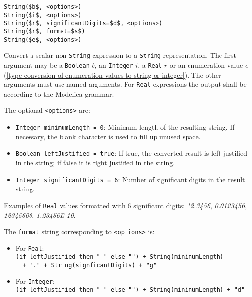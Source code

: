 \begin{operatordefinition*}[String]\label{modelica:to-String}
\begin{synopsis}\begin{lstlisting}
String($b$, <options>)
String($i$, <options>)
String($r$, significantDigits=$d$, <options>)
String($r$, format=$s$)
String($e$, <options>)
\end{lstlisting}\end{synopsis}
\begin{semantics}
Convert a scalar non-\lstinline!String! expression to a \lstinline!String! representation.  The first argument may be a \lstinline!Boolean! $b$, an \lstinline!Integer! $i$, a \lstinline!Real! $r$ or an enumeration value $e$ (\cref{type-conversion-of-enumeration-values-to-string-or-integer}).  The other arguments must use named arguments.  For \lstinline!Real! expressions the output shall be according to the Modelica grammar.

The optional \lstinline!<options>! are:
\begin{itemize}
\item
  \lstinline!Integer minimumLength = 0!: Minimum length of the resulting string.  If necessary, the blank character is used to fill up unused space.
\item
  \lstinline!Boolean leftJustified = true!: If true, the converted result is left justified in the string; if false it is right justified in the string.
\item
  \lstinline!Integer significantDigits = 6!: Number of significant digits in the result string.
\end{itemize}

\begin{nonnormative}
Examples of \lstinline!Real! values formatted with 6 significant digits: \emph{12.3456}, \emph{0.0123456}, \emph{12345600}, \emph{1.23456E-10}.
\end{nonnormative}

The \lstinline!format! string corresponding to \lstinline!<options>! is:
\begin{itemize}
\item
  For \lstinline!Real!:\\
  \lstinline!(if leftJustified then "-" else "") + String(minimumLength)!\\
  \lstinline!  + "." + String(signficantDigits) + "g"!
\item
  For \lstinline!Integer!:\\
  \lstinline!(if leftJustified then "-" else "") + String(minimumLength) + "d"!
\end{itemize}


\end{semantics}
\end{operatordefinition*}

